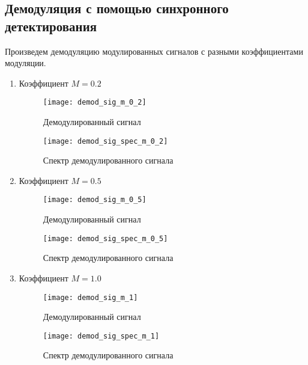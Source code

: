 \subsection{Демодуляция с помощью синхронного детектирования}
Произведем демодуляцию модулированных сигналов с разными коэффициентами модуляции.

\begin{enumerate}
\item Коэффициент $ M = 0.2$
\begin{figure}[H]
	\begin{center}
		\texttt{[image: demod\_sig\_m\_0\_2]}
		\caption{Демодулированный сигнал } 
		\label{pic:signal_demodulated_0_5} %
	\end{center}
\end{figure}

\begin{figure}[H]
	\begin{center}
		\texttt{[image: demod\_sig\_spec\_m\_0\_2]}
		\caption{Спектр демодулированного сигнала} 
		\label{pic:demod_sig_spec_0_5} %
	\end{center}
\end{figure}


\item Коэффициент $ M = 0.5$
\begin{figure}[H]
	\begin{center}
		\texttt{[image: demod\_sig\_m\_0\_5]}
		\caption{Демодулированный сигнал } 
		\label{pic:signal_demodulated_0_2} %
	\end{center}
\end{figure}
\begin{figure}[H]
	\begin{center}
		\texttt{[image: demod\_sig\_spec\_m\_0\_5]}
		\caption{Спектр демодулированного сигнала} 
		\label{pic:demod_sig_spec_0_2} %
	\end{center}
\end{figure}

\item Коэффициент $ M = 1.0$
\begin{figure}[H]
	\begin{center}
		\texttt{[image: demod\_sig\_m\_1]}
		\caption{Демодулированный сигнал } 
		\label{pic:signal_demodulated_1_0} %
	\end{center}
\end{figure}
\begin{figure}[H]
	\begin{center}
		\texttt{[image: demod\_sig\_spec\_m\_1]}
		\caption{Спектр демодулированного сигнала} 
		\label{pic:demod_sig_spec_1_0} %
	\end{center}
\end{figure}


\end{enumerate}
